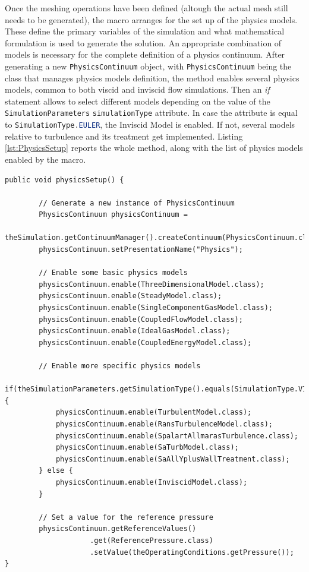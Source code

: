 Once the meshing operations have been defined (altough the actual mesh still needs to be generated), the macro arranges for the set up of the physics models. These define the primary variables of the simulation and what mathematical formulation is used to generate the solution. An appropriate combination of models is necessary for the complete definition of a physics continuum. After generating a new \lstinline[language=Java]!PhysicsContinuum! object, with \lstinline[language=Java]!PhysicsContinuum! being the class that manages physics models definition, the method enables several physics models, common to both viscid and inviscid flow simulations. Then an \emph{if} statement allows to select different models depending on the value of the \lstinline[language=Java]!SimulationParameters! \lstinline[language=Java]!simulationType! attribute. In case the attribute is equal to \lstinline[language=Java]!SimulationType.EULER!, the Inviscid Model is enabled. If not, several models relative to turbulence and its treatment get implemented. Listing \ref{lst:PhysicsSetup} reports the whole method, along with the list of physics models enabled by the macro.
\bigskip
\begin{lstlisting}[caption={\lstinline!physicsSetup! method}, captionpos=b, tabsize=2, label={lst:PhysicsSetup}]
public void physicsSetup() {

		// Generate a new instance of PhysicsContinuum
		PhysicsContinuum physicsContinuum = 
				theSimulation.getContinuumManager().createContinuum(PhysicsContinuum.class);
		physicsContinuum.setPresentationName("Physics");
		
		// Enable some basic physics models
		physicsContinuum.enable(ThreeDimensionalModel.class);
		physicsContinuum.enable(SteadyModel.class);
		physicsContinuum.enable(SingleComponentGasModel.class);
		physicsContinuum.enable(CoupledFlowModel.class);
		physicsContinuum.enable(IdealGasModel.class);
		physicsContinuum.enable(CoupledEnergyModel.class);
		
		// Enable more specific physics models
		if(theSimulationParameters.getSimulationType().equals(SimulationType.VISCOUS)) {
			physicsContinuum.enable(TurbulentModel.class);
			physicsContinuum.enable(RansTurbulenceModel.class);
			physicsContinuum.enable(SpalartAllmarasTurbulence.class);
			physicsContinuum.enable(SaTurbModel.class);
			physicsContinuum.enable(SaAllYplusWallTreatment.class);
		} else {
			physicsContinuum.enable(InviscidModel.class);
		}	
		
		// Set a value for the reference pressure
		physicsContinuum.getReferenceValues()
					.get(ReferencePressure.class)
					.setValue(theOperatingConditions.getPressure());
}
\end{lstlisting}  

